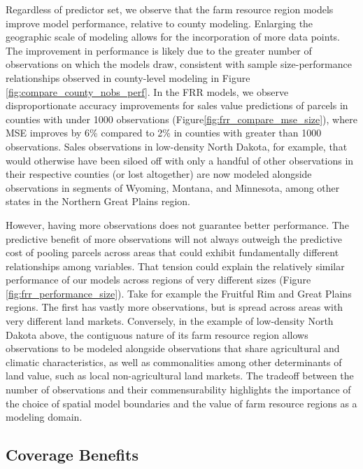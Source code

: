 \documentclass[12pt]{article}
\begin{document}
Regardless of predictor set, we observe that the farm resource region models improve model performance, relative to county modeling. Enlarging the geographic scale of modeling allows for the incorporation of more data points. The improvement in performance is likely due to the greater number of observations on which the models draw, consistent with sample size-performance relationships observed in county-level modeling in Figure \ref{fig:compare_county_nobs_perf}. In the FRR models, we observe disproportionate accuracy improvements for sales value predictions of parcels in counties with under 1000 observations (Figure\ref{fig:frr_compare_mse_size}), where MSE improves by 6\% compared to 2\% in counties with greater than 1000 observations. Sales observations in low-density North Dakota, for example, that would otherwise have been siloed off with only a handful of other observations in their respective counties (or lost altogether) are now modeled alongside observations in segments of Wyoming, Montana, and Minnesota, among other states in the Northern Great Plains region.

However, having more observations does not guarantee better performance. The predictive benefit of more observations will not always outweigh the predictive cost of pooling parcels across areas that could exhibit fundamentally different relationships among variables. That tension could explain the relatively similar performance of our models across regions of very different sizes (Figure \ref{fig:frr_performance_size}). Take for example the Fruitful Rim and Great Plains regions. The first has vastly more observations, but is spread across areas with very different land markets. Conversely, in the example of low-density North Dakota above, the contiguous nature of its farm resource region allows observations to be modeled alongside observations that share agricultural and climatic characteristics, as well as commonalities among other determinants of land value, such as local non-agricultural land markets. The tradeoff between the number of observations and their commensurability highlights the importance of the choice of spatial model boundaries and the value of farm resource regions as a modeling domain. 

\subsection{Coverage Benefits}
\end{document}
